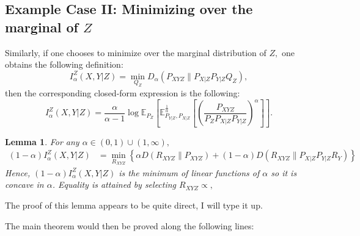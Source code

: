 \documentclass{article}
\numberwithin{theorem}{section}
\newtheorem{lemma}[theorem]{Lemma}
\numberwithin{example}{section}
\numberwithin{remark}{section}
\numberwithin{definition}{section}
\newcommand{\E}{\mathbb{E}}
\begin{document}
\iffalse 
\subsection{Example Case II: Minimizing over the marginal of $Z$}

Similarly, if one chooses to minimize over the marginal distribution of $Z,$ one obtains the following definition:
\begin{equation}
    I^{Z}_\alpha(X,Y|Z) = \min_{Q_{Z}} D_\alpha(P_{XYZ}\|P_{X|Z}P_{Y|Z}Q_Z),
\end{equation}
then the corresponding closed-form expression is the following:
\begin{equation}
    I^{Z}_\alpha(X,Y|Z) = \frac{\alpha}{\alpha-1}\log \E_{P_Z}\left[\E^\frac1\alpha_{P_{Y|Z},P_{X|Z}}\left[\left(\frac{P_{XYZ}}{P_ZP_{X|Z}P_{Y|Z}}\right)^\alpha\right]\right].
\end{equation}

\begin{lemma}\label{Lemma-SibsonViaKL-condZ}
For any $\alpha \in (0,1)\cup (1,\infty),$
\begin{align}
   (1-\alpha)I_\alpha^Z(X,Y|Z) &= \min_{R_{XYZ}} \left\{ \alpha D(R_{XYZ}\|P_{XYZ}) + (1-\alpha) D(R_{XYZ}\|P_{X|Z}P_{Y|Z}R_Y) \right\} \label{Lemma-SibsonViaKL-condZ-eq-main} %
\end{align}
Hence, $(1-\alpha)I_\alpha^Z(X,Y|Z)$ is the minimum of linear functions of $\alpha$ so it is concave in $\alpha$.
Equality is attained by selecting
$R_{XYZ} \propto ,$
\end{lemma}

The proof of this lemma appears to be quite direct, I will type it up.

The main theorem would then be proved along the following lines:
\end{document}
